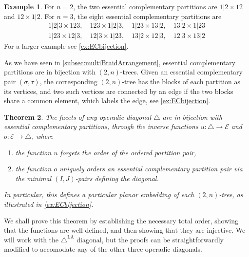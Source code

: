 \documentclass{amsart}
\newtheorem{theorem}{Theorem}[section]
\theoremstyle{definition}
\newtheorem{example}[theorem]{Example}
\newcommand{\LAD}{\triangle^{\mathrm{LA}}}
\newcommand{\EC}{\mathcal{E}} %
\newcommand{\OP}{\triangle} %
\begin{document}
\begin{example}
For $n=2$, the two essential complementary partitions are $1|2 \times 12$ and $12 \times 1|2$. For $n=3$, the eight essential complementary partitions are
\begin{align*}
	1|2|3 \times 123,\quad 
	123 \times 1|2|3,\quad 
	1|23 \times 13|2,\quad 
	13|2 \times 1|23\\
	1|23 \times 12|3,\quad 
	12|3 \times 1|23,\quad 
	13|2 \times 12|3,\quad 
	12|3 \times 13|2
\end{align*}
For a larger example see \cref{ex:ECbijection}. 
\end{example}


As we have seen in \cref{subsec:multiBraidArrangement}, essential complementary partitions are in bijection with $(2,n)$-trees.
Given an essential complementary pair $(\sigma,\tau)$, the corresponding $(2,n)$-tree has the blocks of each partition as its vertices, and two such vertices are connected by an edge if the two blocks share a common element, which labels the edge, see \cref{ex:ECbijection}.


\begin{theorem}
\label{thm:facets}
The facets of any operadic diagonal $\OP$ are in bijection with essential complementary partitions, through the inverse functions $u:\OP \to \EC$ and $o:\EC\to \OP$, where
\begin{enumerate}
    \item the function $u$ forgets the order of the ordered partition pair,
    \item the function $o$ uniquely orders an essential complementary partition pair via the minimal $(I,J)$-pairs defining the diagonal. 
\end{enumerate}
In particular, this defines a particular planar embedding of each $(2,n)$-tree, as illustrated in \cref{ex:ECbijection}.
\end{theorem}

We shall prove this theorem by establishing the necessary total order, showing that the functions are well defined, and then showing that they are injective.
We will work with the $\LAD$ diagonal, but the proofs can be straightforwardly modified to accomodate any of the other three operadic diagonals. 
\end{document}
